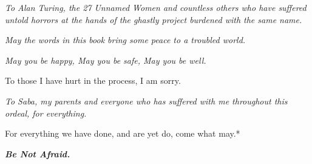 \newpage
\thispagestyle{empty}

\vspace*{\fill}

\begin{center}
\vspace{2cm}

\begin{minipage}{0.7\textwidth}
\centering

\textit{To Alan Turing, the 27 Unnamed Women and countless others who have suffered untold horrors at the hands of the ghastly project burdened with the same name.}

\vspace{1.5cm}

\textit{May the words in this book bring some peace to a troubled world.}

\vspace{1.5cm}

\textit{May you be happy, May you be safe, May you be well.}

\vspace{1.5cm}

To those I have hurt in the process, I am sorry.

\textit{To Saba, my parents and everyone who has suffered with me throughout this ordeal, for everything.}

\vspace{2cm}

For everything we have done, and are yet do, come what may.*

\vspace{3cm}

{\large\textbf{\textit{Be Not Afraid.}}}


\end{minipage}
\end{center}

\vspace*{\fill}

\newpage
